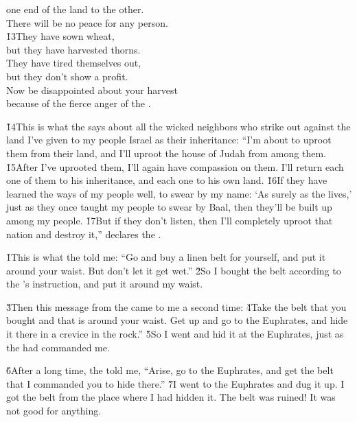 \begin{poetry}
\poemll    one end of the land to the other. \\
\poeml There will be no peace for any person. \\
\poeml \v{13}They have sown wheat, \\
\poemll    but they have harvested thorns. \\
\poeml They have tired themselves out, \\
\poemll    but they don't show a profit. \\
\poeml Now be disappointed about your harvest \\
\poemll    because of the fierce anger of the .
\end{poetry}

\v{14}This is what the  says about all the wicked neighbors who strike out against the land I've given to my people Israel as their inheritance: ``I'm about to uproot them from their land, and I'll uproot the house of Judah from among them. \v{15}After I've uprooted them, I'll again have compassion on them. I'll return each one of them to his inheritance, and each one to his own land. \v{16}If they have learned the ways of my people well, to swear by my name: `As surely as the  lives,' just as they once taught my people to swear by Baal, then they'll be built up among my people. \v{17}But if they don't listen, then I'll completely uproot that nation and destroy it,'' declares the .

\v{1}This is what the  told me: ``Go and buy a linen belt for yourself, and put it around your waist. But don't let it get wet.'' \v{2}So I bought the belt according to the 's instruction, and put it around my waist.

\v{3}Then this message from the  came to me a second time: \v{4}Take the belt that you bought and that is around your waist. Get up and go to the Euphrates, and hide it there in a crevice in the rock.'' \v{5}So I went and hid it at the Euphrates, just as the  had commanded me.

\v{6}After a long time, the  told me, ``Arise, go to the Euphrates, and get the belt that I commanded you to hide there.'' \v{7}I went to the Euphrates and dug it up. I got the belt from the place where I had hidden it. The belt was ruined! It was not good for anything.

